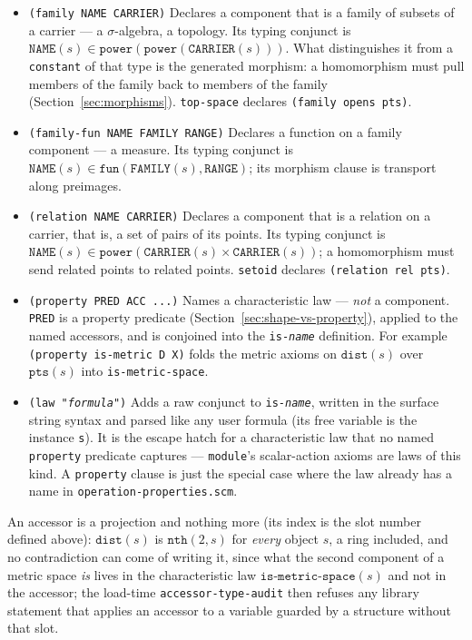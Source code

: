 \begin{itemize}
\item \texttt{(family NAME CARRIER)}
  Declares a component that is a family of subsets of a carrier --- a
  $\sigma$-algebra, a topology.  Its typing conjunct is
  $\mathtt{NAME}(s) \in \mathtt{power}(\mathtt{power}(\mathtt{CARRIER}(s)))$.
  What distinguishes it from a \texttt{constant} of that type is the generated
  morphism: a homomorphism must pull members of the family back to members of the
  family (Section~\ref{sec:morphisms}).  \texttt{top-space} declares
  \texttt{(family opens pts)}.

\item \texttt{(family-fun NAME FAMILY RANGE)}
  Declares a function on a family component --- a measure.  Its typing conjunct
  is $\mathtt{NAME}(s) \in \mathtt{fun}(\mathtt{FAMILY}(s), \mathtt{RANGE})$; its
  morphism clause is transport along preimages.

\item \texttt{(relation NAME CARRIER)}
  Declares a component that is a relation on a carrier, that is, a set of pairs of
  its points.  Its typing conjunct is
  $\mathtt{NAME}(s) \in \mathtt{power}(\mathtt{CARRIER}(s) \times \mathtt{CARRIER}(s))$;
  a homomorphism must send related points to related points.  \texttt{setoid}
  declares \texttt{(relation rel pts)}.

\item \texttt{(property PRED ACC ...)}
  Names a characteristic law --- \emph{not} a component.  \texttt{PRED}
  is a property predicate (Section~\ref{sec:shape-vs-property}), applied
  to the named accessors, and is conjoined into the
  \texttt{is-\textit{name}} definition.  For example
  \texttt{(property is-metric D X)} folds the metric axioms on
  $\mathtt{dist}(s)$ over $\mathtt{pts}(s)$ into \texttt{is-metric-space}.

\item \texttt{(law "\textit{formula}")}
  Adds a raw conjunct to \texttt{is-\textit{name}}, written in the surface
  string syntax and parsed like any user formula (its free variable is the
  instance \texttt{s}).  It is the escape hatch for a characteristic law that no
  named \texttt{property} predicate captures --- \texttt{module}'s scalar-action
  axioms are laws of this kind.  A \texttt{property} clause is just the special
  case where the law already has a name in \texttt{operation-properties.scm}.

\end{itemize}

An accessor is a projection and nothing more (its index is the slot
number defined above): $\mathtt{dist}(s)$ is $\mathtt{nth}(2, s)$ for \emph{every}
object $s$, a ring included, and no contradiction can come of writing it,
since what the second component of a metric space \emph{is} lives in the
characteristic law $\mathtt{is\text{-}metric\text{-}space}(s)$ and not in
the accessor; the load-time \texttt{accessor-type-audit} then refuses any
library statement that applies an accessor to a variable guarded by a
structure without that slot.

